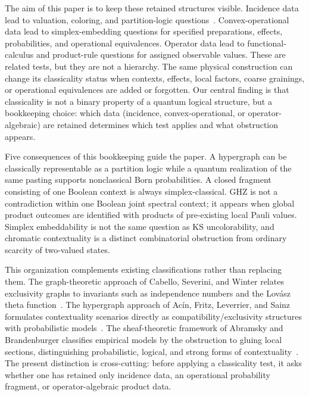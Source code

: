 \documentclass[aps,pra,twocolumn,superscriptaddress,nofootinbib]{revtex4-2}
\begin{document}
The aim of this paper is to keep these retained structures visible.  Incidence data lead to valuation, coloring, and partition-logic questions~\cite{kochen1,svozil-2001-eua,svozil-2025-color}.  Convex-operational data lead to simplex-embedding questions for specified preparations, effects, probabilities, and operational equivalences.  Operator data lead to functional-calculus and product-rule questions for assigned observable values.  These are related tests, but they are not a hierarchy.  The same physical construction can change its classicality status when contexts, effects, local factors, coarse grainings, or operational equivalences are added or forgotten.
Our central finding is that classicality is not a binary property of a quantum logical structure, but a bookkeeping choice: which data (incidence, convex-operational, or operator-algebraic) are retained determines which test applies and what obstruction appears.

Five consequences of this bookkeeping guide the paper.  A hypergraph can be
classically representable as a partition logic while a quantum realization of
the same pasting supports nonclassical Born probabilities.  A closed fragment
consisting of one Boolean context is always simplex-classical.  GHZ is not a
contradiction within one Boolean joint spectral context; it appears when global
product outcomes are identified with products of pre-existing local Pauli
values.  Simplex embeddability is not the same question as KS uncolorability,
and chromatic contextuality is a distinct combinatorial obstruction from
ordinary scarcity of two-valued states.

This organization complements existing classifications rather than replacing them.  The graph-theoretic approach of Cabello, Severini, and Winter relates exclusivity graphs to invariants such as independence numbers and the Lov\'asz theta function~\cite{cabello-severini-winter-2014}.  The hypergraph approach of Ac\'in, Fritz, Leverrier, and Sainz formulates contextuality scenarios directly as compatibility/exclusivity structures with probabilistic models~\cite{acin-fritz-leverrier-sainz-2015}.  The sheaf-theoretic framework of Abramsky and Brandenburger classifies empirical models by the obstruction to gluing local sections, distinguishing probabilistic, logical, and strong forms of contextuality~\cite{abramsky-brandenburger-2011}.  The present distinction is cross-cutting: before applying a classicality test, it asks whether one has retained only incidence data, an operational probability fragment, or operator-algebraic product data.
\end{document}
